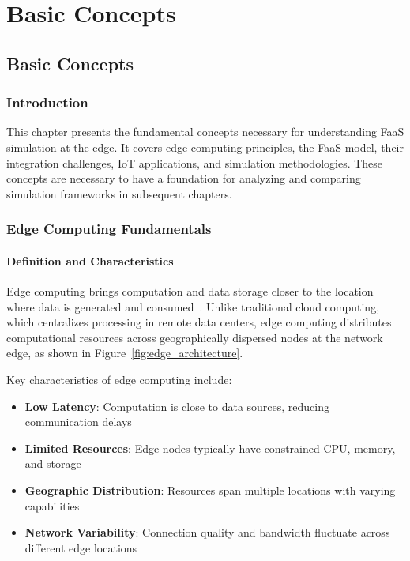 \part{Basic Concepts}
\chapter{Basic Concepts}

\section{Introduction}

This chapter presents the fundamental concepts necessary for understanding FaaS simulation at the edge. It covers edge computing principles, the FaaS model, their integration challenges, IoT applications, and simulation methodologies. These concepts are necessary to have a foundation for analyzing and comparing simulation frameworks in subsequent chapters.

\section{Edge Computing Fundamentals}

\subsection{Definition and Characteristics}

Edge computing brings computation and data storage closer to the location where data is generated and consumed~\cite{aslanpour2021serverless}. Unlike traditional cloud computing, which centralizes processing in remote data centers, edge computing distributes computational resources across geographically dispersed nodes at the network edge, as shown in Figure~\ref{fig:edge_architecture}.

Key characteristics of edge computing include:
\begin{itemize}
    \item \textbf{Low Latency}: Computation is close to data sources, reducing communication delays
    \item \textbf{Limited Resources}: Edge nodes typically have constrained CPU, memory, and storage
    \item \textbf{Geographic Distribution}: Resources span multiple locations with varying capabilities
    \item \textbf{Network Variability}: Connection quality and bandwidth fluctuate across different edge locations
\end{itemize}

